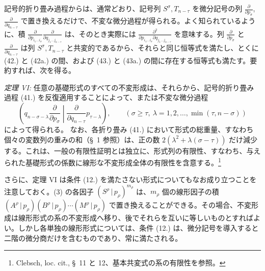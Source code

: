 \documentclass[11pt]{jlreq}
\newcommand{\pair}[2]{(#1\,|\,#2)}
\begin{document}
記号的折り畳み過程からは、通常どおり、記号列 $S^\sigma,T_{n-\tau}$ を微分記号の列 $\frac{\partial}{\partial p_\sigma}$, $\frac{\partial}{\partial q_{n-\tau}}$ で置き換えるだけで、不変な微分過程が得られる。よく知られているように、積 $\frac{\partial}{\partial p_{i_1\ldots i_\sigma}}\frac{\partial}{\partial q_{j_1\ldots j_{n-\tau}}}$ は、そのとき実際には $\frac{\partial^2}{\partial p_{i_1\ldots i_\sigma}\partial q_{j_1\ldots j_{n-\tau}}}$ を意味する。列 $\frac{\partial}{\partial p_\sigma}$ と $\frac{\partial}{\partial q_{n-\tau}}$ は列 $S^\sigma,T_{n-\tau}$ と共変的であるから、それらと同じ恒等式を満たし、とくに (42.) と (42a.) の間、および (43.) と (43a.) の間に存在する恒等式も満たす。要約すれば、次を得る。

\emph{定理 VI:} 任意の基礎形式のすべての不変形成は、それらから、記号的折り畳み過程 (41.) を反復適用することによって、または不変な微分過程
\begin{equation}
 \left(q_{n-\sigma-\lambda}\frac{\partial}{\partial p_\sigma}\middle|\frac{\partial}{\partial q_{n-\tau}}p_{\tau-\lambda}\right),
 \qquad(\sigma\ge\tau,\ \lambda=1,2,\ldots,\min(\tau,n-\sigma))
\tag{45}
\end{equation}
によって得られる。
なお、各折り畳み (41.) において形式の総重量、すなわち個々の変数列の重みの和（\S\ 1 参照）は、正の数 $2(\lambda^2+\lambda(\sigma-\tau))$ だけ減少する。これは、一般の有限性証明とは独立に、形式列の有限性、すなわち、与えられた基礎形式の係数に線形な不変形成全体の有限性を含意する。\footnote{Clebsch, loc. cit., \S\ 11 と 12、基本共変式の系の有限性を参照。}

さらに、定理 VI は条件 (12.) を満たさない形式についてもなお成り立つことを注意しておく。(3) の各因子 $\pair{S^\rho}{p_\rho}^{m_\rho}$ は、$m_\rho$ 個の線形因子の積 $\pair{A^\rho}{p_\rho}\pair{B^\rho}{p_\rho}\cdots\pair{M^\rho}{p_\rho}$ で置き換えることができる。その場合、不変形成は線形形式の系の不変形成へ移り、後でそれらを互いに等しいものとすればよい。しかし各単独の線形形式については、条件 (12.) は、微分記号を導入すると二階の微分商だけを含むものであり、常に満たされる。
\end{document}
